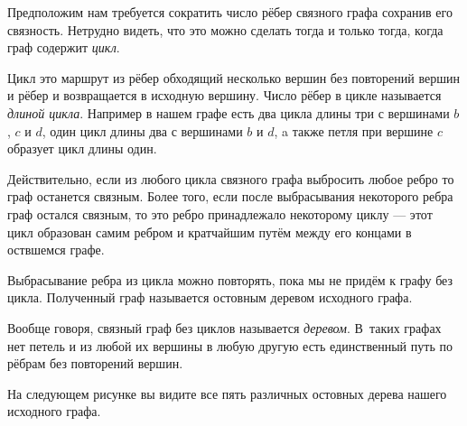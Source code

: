 \documentclass{article}
\begin{document}
Предположим нам требуется сократить число рёбер связного графа сохранив его связность.
Нетрудно видеть, что это можно сделать тогда и только тогда, когда граф содержит \emph{цикл}.

Цикл это маршрут из рёбер обходящий несколько вершин без повторений вершин и рёбер 
и возвращается в исходную вершину. 
Число рёбер в цикле называется \emph{длиной цикла}.
Например в нашем графе есть два цикла  длины три с вершинами $b$, $c$ и $d$, 
один цикл длины два с вершинами $b$ и $d$,
a также петля при вершине $c$ образует цикл длины один.

Действительно, если из любого цикла связного графа выбросить любое ребро то граф останется связным.
Более того, если после выбрасывания некоторого ребра граф остался связным, то это ребро принадлежало некоторому циклу --- этот цикл образован самим ребром и кратчайшим путём между его концами в оствшемся графе.

Выбрасывание ребра из цикла можно повторять, пока мы не придём к графу без цикла.
Полученный граф называется остовным деревом исходного графа.

Вообще говоря, связный граф без циклов называется \emph{деревом}.
В~таких графах нет петель и из любой их вершины в любую другую есть единственный путь по рёбрам без повторений вершин.

На следующем рисунке вы видите все пять различных остовных дерева нашего исходного графа.
\end{document}
